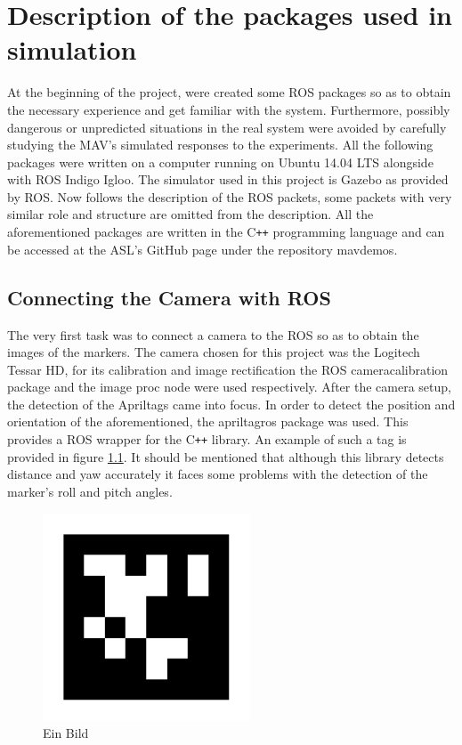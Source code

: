 \chapter{Description of the packages used in simulation}
\label{sec:SimulationPackages}

At the beginning of the project, were created some ROS packages so as to obtain the necessary experience and get familiar with the system. Furthermore, possibly dangerous or unpredicted situations in the real system were avoided by carefully studying the MAV's simulated responses to the experiments. All the following packages were written on a computer running on Ubuntu 14.04 LTS alongside with ROS Indigo Igloo. The simulator used in this project is Gazebo\cite{GazeboSimulator} as provided by ROS. Now follows the description of the ROS packets, some packets with very similar role and structure are omitted from the description. All the aforementioned packages are written in the C\texttt{++} programming language\cite{Stroustrup} and can be accessed at the ASL's GitHub page under the repository mav\textunderscore demos\cite{MyRepoGitHub}. 


\section{Connecting the Camera with ROS}
\label{sec:connectedCamera}
The very first task was to connect a camera to the ROS so as to obtain the images of the markers. The camera chosen for this project was the Logitech Tessar HD, for its calibration and image rectification the ROS camera\textunderscore calibration package and the image \textunderscore proc node were used respectively. After the camera setup, the detection of the Apriltags\cite{olson2011tags} came into focus. In order to detect the position and orientation of the aforementioned, the apriltag\textunderscore ros package was used. This provides a ROS wrapper for the C\texttt{++} library\cite{ROSApriltag}. An example of such a tag is provided in figure \ref{pics:tag36h11}. It should be mentioned that although this library detects distance and yaw accurately it faces some problems with the detection of the marker's roll and pitch angles.

\begin{figure}
   \centering
   \includegraphics[width=0.55\textwidth]{images/tag36h11_im_large.pdf}
   \caption{Ein Bild}
   \label{pics:tag36h11}
\end{figure}


